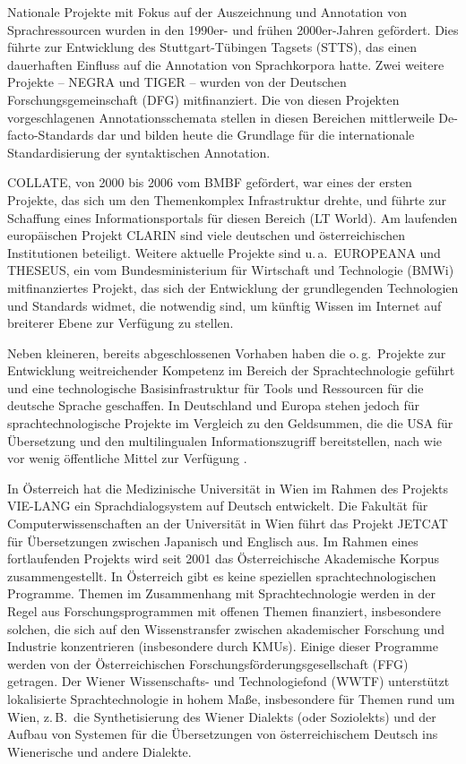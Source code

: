 \documentclass[]{../../metanetpaper}
\begin{document}
\begin{multicols}{2}
Nationale Projekte mit Fokus auf der Auszeichnung und Annotation von Sprachressourcen wurden in den 1990er- und frühen 2000er-Jahren gefördert. Dies führte zur Entwicklung des Stutt\-gart-Tü\-bingen Tag\-sets (STTS), das einen dauerhaften Einfluss auf die Annotation von Sprachkorpora hatte. Zwei weitere Projekte -- NEGRA und TIGER -- wurden von der Deutschen Forschungsgemeinschaft (DFG) mitfinanziert. Die von diesen Projekten vorgeschlagenen Annotationsschemata stellen in diesen Bereichen mittlerweile De-facto-Standards dar und bilden heute die Grundlage für die internationale Standardisierung der syntaktischen Annotation.

COLLATE, von 2000 bis 2006 vom BMBF gefördert, war eines der ersten Projekte, das sich um den Themenkomplex Infrastruktur drehte, und führte zur Schaffung eines Informationsportals für diesen Bereich (LT World). Am laufenden europäischen Projekt CLARIN sind viele deutschen und österreichischen Institutionen beteiligt. Weitere aktuelle Projekte sind u.\,a.~EUROPEANA und THESEUS, ein vom Bundesministerium für Wirtschaft und Technologie (BMWi) mitfinanziertes Projekt, das sich der Entwicklung der grundlegenden Technologien und Standards widmet, die notwendig sind, um künftig Wissen im Internet auf breiterer Ebene zur Verfügung zu stellen.

Neben kleineren, bereits abgeschlossenen Vorhaben haben die o.\,g.~Projekte zur Entwicklung weitreichender Kompetenz im Bereich der Sprachtechnologie geführt und eine technologische Basisinfrastruktur für Tools und Ressourcen für die deutsche Sprache geschaffen. In Deutschland und Europa stehen jedoch für sprachtechnologische Projekte im Vergleich zu den Geldsummen, die die USA für Übersetzung und den multilingualen Informationszugriff bereitstellen, nach wie vor wenig öffentliche Mittel zur Verfügung \cite{laz1}.

In Österreich hat die Medizinische Universität in Wien im Rahmen des Projekts VIE-LANG ein Sprachdialogsystem auf Deutsch entwickelt. Die Fakultät für Computerwissenschaften an der Universität in Wien führt das Projekt JETCAT für Übersetzungen zwischen Japanisch und Englisch aus. Im Rahmen eines fortlaufenden Projekts wird seit 2001 das Österreichische Akademische Korpus zusammengestellt. In Österreich gibt es keine speziellen sprachtechnologischen Programme. Themen im Zusammenhang mit Sprachtechnologie werden in der Regel aus Forschungsprogrammen mit offenen Themen finanziert, insbesondere solchen, die sich auf den Wissenstransfer zwischen akademischer Forschung und Industrie konzentrieren (insbesondere durch KMUs). Einige dieser Programme werden von der Österreichischen Forschungsförderungsgesellschaft (FFG) getragen. Der Wiener Wissenschafts- und Technologiefond (WWTF) unterstützt lokalisierte Sprachtechnologie in hohem Maße, insbesondere für Themen rund um Wien, z.\,B.~die Synthetisierung des Wiener Dialekts (oder Soziolekts) und der Aufbau von Systemen für die Übersetzungen von österreichischem Deutsch ins Wienerische und andere Dialekte. 


\end{multicols}
\end{document}
